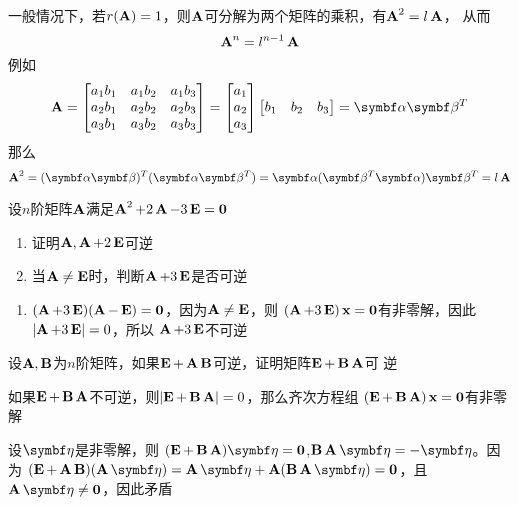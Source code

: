 \documentclass{article}
\begin{document}
\begin{remark}
一般情况下，若\(r(\bA)=1\)，则\(\bA\)可分解为两个矩阵的乘积，有\(\bA^2=l\bA\)，
从而
\begin{equation*}
\bA^n=l^{n-1}\bA
\end{equation*}
例如
\begin{equation*}
\bA=
\begin{bmatrix}
a_1b_1&a_1b_2&a_1b_3\\
a_2b_1&a_2b_2&a_2b_3\\
a_3b_1&a_3b_2&a_3b_3\\
\end{bmatrix}=
\begin{bmatrix}
a_1\\a_2\\a_3
\end{bmatrix}
\begin{bmatrix}
b_1&b_2&b_3
\end{bmatrix}=\balpha\bbeta^T
\end{equation*}
那么
\begin{equation*}
\bA^2=(\balpha\bbeta)^T(\balpha\bbeta^T)=\balpha(\bbeta^T\balpha)\bbeta^T=l\bA
\end{equation*}
\end{remark}


\begin{examplle}[]
设\(n\)阶矩阵\(\bA\)满足\(\bA^2+2\bA-3\bE=\bzero\)
\begin{enumerate}
\item 证明\(\bA,\bA+2\bE\)可逆
\item 当\(\bA\neq\bE\)时，判断\(\bA+3\bE\)是否可逆
\end{enumerate}


\begin{enumerate}
\item \((\bA+3\bE)(\bA-\bE)=\bzero\)，因为\(\bA\neq\bE\)，则
\((\bA+3\bE)\bx=\bzero\)有非零解，因此\(\abs{\bA+3\bE}=0\)，所以
\(\bA+3\bE\)不可逆
\end{enumerate}
\end{examplle}

\begin{examplle}[]
设\(\bA,\bB\)为\(n\)阶矩阵，如果\(\bE+\bA\bB\)可逆，证明矩阵\(\bE+\bB\bA\)可
逆

如果\(\bE+\bB\bA\)不可逆，则\(\abs{\bE+\bB\bA}=0\)，那么齐次方程组
\((\bE+\bB\bA)\bx=\bzero\)有非零解

设\(\boldeta\)是非零解，则
\((\bE+\bB\bA)\boldeta=\bzero\),\(\bB\bA\boldeta=-\boldeta\)。因为
\((\bE+\bA\bB)(\bA\boldeta)=\bA\boldeta+\bA(\bB\bA\boldeta)=\bzero\)，且
\(\bA\boldeta\neq\bzero\)，因此矛盾
\end{examplle}
\end{document}
